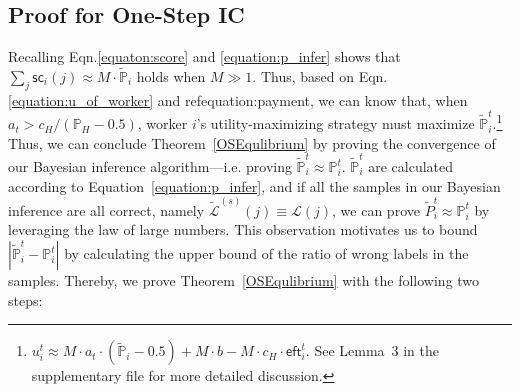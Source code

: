 \subsection{Proof for One-Step IC}
Recalling Eqn.\ref{equaton:score} and \ref{equation:p_infer} shows that $\sum_j \textsf{sc}_i(j)\approx M\cdot \tilde{\mathbb{P}}_i$ holds when $M\gg 1$. Thus, based on Eqn.\ref{equation:u_of_worker} and ref{equation:payment}, we can know that, when $a_t>c_H/(\mathbb{P}_H-0.5)$, worker $i$'s utility-maximizing strategy must maximize $\tilde{\mathbb{P}}^t_i$.\footnote{$u_i^t\approx  M\cdot a_t\cdot (\tilde{\mathbb{P}}_i-0.5) + M\cdot b- M \cdot c_H\cdot \textsf{eft}^{t}_i$. See Lemma~3 in the supplementary file for more detailed discussion. 
}
Thus, we can conclude Theorem~\ref{OSEqulibrium} by proving the convergence of our Bayesian inference algorithm---i.e. proving $\tilde{\mathbb{P}}^t_i\approx \mathbb{P}^t_i$.
$\tilde{\mathbb{P}}^t_i$ are calculated according to Equation~\ref{equation:p_infer}, and if all the samples in our Bayesian inference are all correct, namely $\tilde{\mathcal{L}}^{(s)}(j)\equiv\mathcal{L}(j)$, we can prove $\tilde{P}^t_i\approx \mathbb{P}^t_i$ by leveraging the law of large numbers.
This observation motivates us to bound $|\tilde{\mathbb{P}}^t_i-\mathbb{P}^t_i|$ by calculating the upper bound of the ratio of wrong labels in the samples.
Thereby, we prove Theorem~\ref{OSEqulibrium} with the following two steps:

